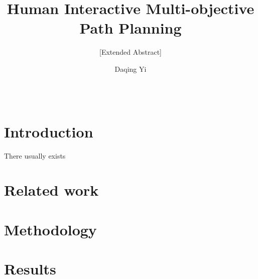 \documentclass{acm_proc_article-sp}
\begin{document}
\title{Human Interactive Multi-objective Path Planning}
\subtitle{[Extended Abstract]
}

\author{
\alignauthor
Daqing Yi \\%
       \\
       \\
}

\date{}

\maketitle
\begin{abstract}
\end{abstract}

\begin{comment}
Extended abstract — an anonymized, two-page description of the applicant's past, current, or proposed work (templates available) covering:
(1)the key research questions/motivation of the applicant's work,
(2)background and related work that informs the research,
(3)the research approach and methodology, and
(4)results to date (if any) and a description of remaining work.
\end{comment}

\section{Introduction}
There usually exists 

\section{Related work}


\section{Methodology}

\section{Results}



\end{document}
